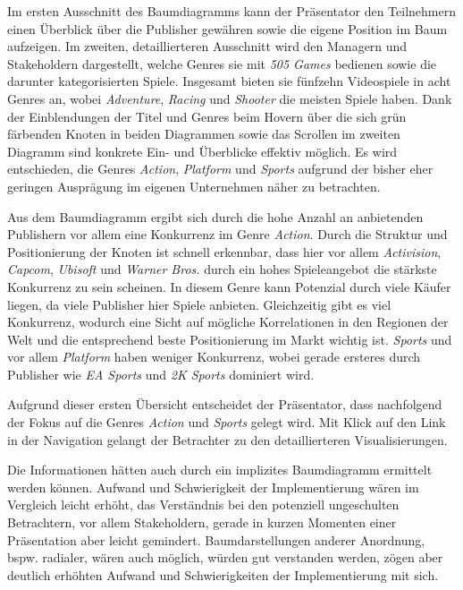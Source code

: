 \documentclass[usegeometry=true]{scrartcl}
\begin{document}
Im ersten Ausschnitt des Baumdiagramms kann der Präsentator den Teilnehmern einen Überblick über die Publisher gewähren sowie die eigene Position im Baum aufzeigen.
Im zweiten, detaillierteren Ausschnitt wird den Managern und Stakeholdern dargestellt, welche Genres sie mit \textit{505 Games} bedienen sowie die darunter kategorisierten Spiele.
Insgesamt bieten sie fünfzehn Videospiele in acht Genres an, wobei \textit{Adventure}, \textit{Racing} und \textit{Shooter} die meisten Spiele haben.
Dank der Einblendungen der Titel und Genres beim Hovern über die sich grün färbenden Knoten in beiden Diagrammen sowie das Scrollen im zweiten Diagramm sind konkrete Ein- und Überblicke effektiv möglich. 
Es wird entschieden, die Genres \textit{Action}, \textit{Platform} und \textit{Sports} aufgrund der bisher eher geringen Ausprägung im eigenen Unternehmen näher zu betrachten. 

Aus dem Baumdiagramm ergibt sich durch die hohe Anzahl an anbietenden Publishern vor allem eine Konkurrenz im Genre \textit{Action}. 
Durch die Struktur und Positionierung der Knoten ist schnell erkennbar, dass hier vor allem \textit{Activision}, \textit{Capcom}, \textit{Ubisoft} und \textit{Warner Bros.} durch ein hohes Spieleangebot die stärkste Konkurrenz zu sein scheinen. 
In diesem Genre kann Potenzial durch viele Käufer liegen, da viele Publisher hier Spiele anbieten. 
Gleichzeitig gibt es viel Konkurrenz, wodurch eine Sicht auf mögliche Korrelationen in den Regionen der Welt und die entsprechend beste Positionierung im Markt wichtig ist.
\textit{Sports} und vor allem \textit{Platform} haben weniger Konkurrenz, wobei gerade ersteres durch Publisher wie \textit{EA Sports} und \textit{2K Sports} dominiert wird.

Aufgrund dieser ersten Übersicht entscheidet der Präsentator, dass nachfolgend der Fokus auf die Genres \textit{Action} und \textit{Sports} gelegt wird.
Mit Klick auf den Link in der Navigation gelangt der Betrachter zu den detaillierteren Visualisierungen.

Die Informationen hätten auch durch ein implizites Baumdiagramm ermittelt werden können. Aufwand und Schwierigkeit der Implementierung wären im Vergleich leicht erhöht, das Verständnis bei den potenziell ungeschulten Betrachtern, vor allem Stakeholdern, gerade in kurzen Momenten einer Präsentation aber leicht gemindert. 
Baumdarstellungen anderer Anordnung, bspw. radialer, wären auch möglich, würden gut verstanden werden, zögen aber deutlich erhöhten Aufwand und Schwierigkeiten der Implementierung mit sich. 
\end{document}
